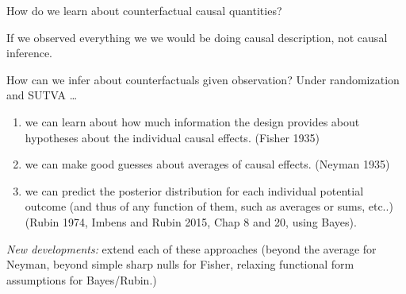 \begin{frame}{How do we learn about counterfactual causal quantities?}

  If we observed everything we we would be doing causal description, not
  causal inference. 

  \medskip

  How can we infer about counterfactuals given observation? Under
  randomization and SUTVA \ldots

  \begin{enumerate}
    \item we can learn about how much information the design provides about
      hypotheses about the individual causal effects. (Fisher 1935)
    \item we can make good guesses about averages of causal effects. (Neyman
      1935)
    \item we can predict the posterior distribution for each individual
      potential outcome (and thus of any function of them, such as averages or
      sums, etc..) (Rubin 1974, Imbens and Rubin 2015, Chap 8 and 20, using Bayes).
  \end{enumerate}

  \emph{New developments:} extend each of these approaches (beyond the average for
  Neyman, beyond simple sharp nulls for Fisher, relaxing functional form
  assumptions for Bayes/Rubin.)

\end{frame}



